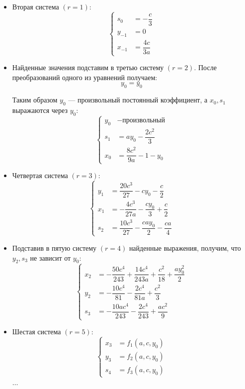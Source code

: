 \begin{itemize}

\item Вторая система $ (r = 1) $:
\begin{equation*}
\left\{
	\begin{aligned}
		s_{0} &= -\dfrac{c}{3} \\
		y_{-1} &= 0 \\
		x_{-1} &= \dfrac{4c}{3a}
	\end{aligned}
\right.
\end{equation*}

\item Найденные значения подставим в третью систему $ (r = 2) $. После преобразований одного из уравнений получаем:
$$
	y_0 = y_0
$$ 

Таким образом $ y_0 $ --- произвольный постоянный коэффициент, а $ x_0, s_1 $ выражаются через $ y_0 $:
\begin{equation*}
\left\{
	\begin{aligned}
		y_{0} &- \text{произвольный} \\
		s_{1} &= ay_0 - \dfrac{2c^2}{3} \\
		x_{0} &= \dfrac{8c^2}{9a} - 1 - y_0
	\end{aligned}
\right.
\end{equation*}

\item Четвертая система $ (r = 3) $:
\begin{equation*}
\left\{
	\begin{aligned}
		y_1 &= \dfrac{20c^3}{27} - cy_0 - \dfrac{c}{2} \\
		x_1 &= -\dfrac{4c^3}{27a} - \dfrac{cy_0}{3} + \dfrac{c}{2} \\
		s_2 &= \dfrac{10c^3}{27} - \dfrac{cay_0}{2} - \dfrac{ca}{4}
	\end{aligned}
\right.
\end{equation*}

\item Подставив в пятую систему $ (r = 4) $ найденные выражения, получим, что $ y_2,s_3 $ не зависит от $ y_0 $:
\begin{equation*}
\left\{
	\begin{aligned}
		x_2 &= -\dfrac{50c^4}{243} + \dfrac{14c^4}{243a} + \dfrac{c^2}{18} + \dfrac{ay^2_0}{2}\\
		y_2 &= -\dfrac{10c^4}{81} - \dfrac{2c^4}{81a} + \dfrac{c^2}{3} \\
		s_3 &= -\dfrac{10ac^4}{243} - \dfrac{2c^4}{243} + \dfrac{ac^2}{9}
	\end{aligned}
\right.
\end{equation*}

\item Шестая система $ (r = 5) $:
\begin{equation*}
\left\{
	\begin{aligned}
		x_3 &= f_1(a,c,y_0) \\
		y_3 &= f_2(a,c,y_0) \\
		s_4 &= f_3(a,c,y_0)
	\end{aligned}
\right.
\end{equation*}

\begin{center}
	$ \ldots $
\end{center}

\end{itemize}